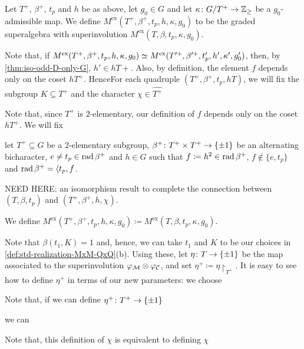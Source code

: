 
\begin{defi}
    Let $T^+$, $\beta^+$, $t_p$ and $h$ be as above, let $g_0 \in G$ and let $\kappa\colon G/T^+ \to \mathbb{Z}_{\geq}$ be a $g_0$-admissible map. 
    We define $M^{\mathrm{ex}}(T^+, \beta^+, t_p, h, \kappa, g_0)$ to be the graded superalgebra with superinvolution $M^{\mathrm{ex}}(T, \beta, t_p, \kappa, g_0)$. 
\end{defi}

Note that, if $M^{\mathrm{ex}}(T^+, \beta^+, t_p, h, \kappa, g_0) \simeq M^{\mathrm{ex}}(T'^+, \beta'^+, t_p', h', \kappa', g_0')$, then, by \cref{thm:iso-odd-D-only-G}, $h' \in h T+$. 
Also, by definition, the element $f$ depends only on the coset $hT^+$. 
HenceFor each quadruple $(T^+, \beta^+, t_p, hT)$, we will fix the subgroup $K \subseteq T^+$ and the character $\chi \in \widehat{T^+}$

Note that, since $T^+$ is $2$-elementary, our definition of $f$ depends only on the coset $hT^+$. 
We will fix

let $T^+ \subseteq G$ be a $2$-elementary subgroup, $\beta^+\colon T^+ \times T^+ \to \{ \pm 1 \}$ be an alternating bicharacter, $e \neq t_p \in \operatorname{rad} \beta^+$ and $h\in G$ such that $f\coloneqq h^2 \in \operatorname{rad} \beta^+$, $f \not\in \{e, t_p \}$ and $\operatorname{rad} \beta^+ = \langle t_p, f$.

NEED HERE: an isomorphism result to complete the connection between $(T, \beta, t_p)$ and $(T^+, \beta^+, h, \chi)$. 



We define $M^{\mathrm{ex}}(T^+, \beta^+, t_p, h, \kappa, g_0) \coloneqq M^{\mathrm{ex}}(T, \beta, t_p, \kappa, g_0)$. 

Note that $\beta(t_1, K) = 1$ and, hence, we can take $t_1$ and $K$ to be our choices in \cref{def:std-realization-MxM-QxQ}(b). 
Using these, let $\eta \colon T \to \{ \pm 1 \}$ be the map associated to the superinvolution $\varphi_{\mathcal M} \otimes \varphi_{\mathcal C}$, and set $\eta^+ \coloneqq \eta\restriction_{T^+}$. 
It is easy to see how to define $\eta^+$ in terms of our new parameters: we choose 



Note that, if  we can define $\eta^+\colon T^+ \to \{ \pm 1 \}$




we can

Note that, this definition of $\chi$ is equivalent to defining $\chi$